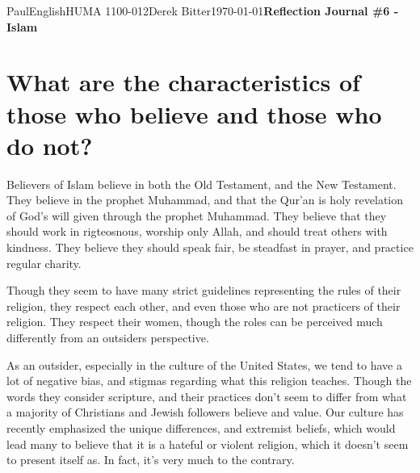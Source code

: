 \documentclass[12pt,letterpaper]{article}
\begin{document}
\begin{mla}{Paul}{English}{HUMA 1100-012}{Derek Bitter}{\today}{\textbf{Reflection Journal \#6 - Islam}}

\section{What are the characteristics of those who believe and those
  who do not?}






Believers of Islam believe in both the Old Testament, and the New
Testament. They believe in the prophet Muhammad, and that the Qur'an
is holy revelation of God's will given through the prophet Muhammad.
They believe that they should work in rigteosnous, worship only Allah,
and should treat others with kindness. They believe they should speak
fair, be steadfast in prayer, and practice regular charity.

Though they seem to have many strict guidelines representing the rules
of their religion, they respect each other, and even those who are not
practicers of their religion. They respect their women, though the
roles can be perceived much differently from an outsiders perspective.

As an outsider, especially in the culture of the United States, we
tend to have a lot of negative bias, and stigmas regarding what this
religion teaches. Though the words they consider scripture, and their
practices don't seem to differ from what a majority of Christians and
Jewish followers believe and value. Our culture has recently
emphasized the unique differences, and extremist beliefs, which would
lead many to believe that it is a hateful or violent religion, which
it doesn't seem to present itself as. In fact, it's very much to the
contrary.






\end{mla}
\end{document}
